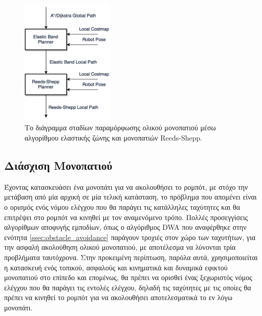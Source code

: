 \begin{figure}[!ht]
	\centering
	\includegraphics[height=6cm]{Chapters/Chapter3/Figures/rsband_diagram.png}
	\caption{Το διάγραμμα σταδίων παραμόρφωσης ολικού μονοπατιού μέσω αλγορίθμου ελαστικής ζώνης και μονοπατιών Reeds-Shepp.}
	\label{fig:rsband_diagram}
\end{figure}


\subsection{Διάσχιση Μονοπατιού} \label{ssec:path_following}
Έχοντας κατασκευάσει ένα μονοπάτι για να ακολουθήσει το ρομπότ, με στόχο την μετάβαση από μία αρχική σε μία τελική κατάσταση, το πρόβλημα που απομένει είναι ο ορισμός ενός νόμου ελέγχου που θα παράγει τις κατάλληλες ταχύτητες και θα επιτρέψει στο ρομπότ να κινηθεί με τον αναμενόμενο τρόπο. Πολλές προσεγγίσεις αλγορίθμων αποφυγής εμποδίων, όπως ο αλγόριθμος DWA \cite{dwa} που αναφέρθηκε στην ενότητα \ref{ssec:obstacle_avoidance} παράγουν τροχιές στον χώρο των ταχυτήτων, για την ασφαλή ακολούθηση ολικού μονοπατιού, με αποτέλεσμα να λύνονται τρία προβλήματα ταυτόχρονα. Στην προκειμένη περίπτωση, παρόλα αυτά, χρησιμοποιείται η κατασκευή ενός τοπικού, ασφαλούς και κινηματικά και δυναμικά εφικτού μονοπατιού στο επίπεδο και επομένως, θα πρέπει να ορισθεί ένας ξεχωριστός νόμος ελέγχου που θα παράγει τις εντολές ελέγχου, δηλαδή τις ταχύτητες με τις οποίες θα πρέπει να κινηθεί το ρομπότ για να ακολουθήσει αποτελεσματικά το εν λόγω μονοπάτι.

